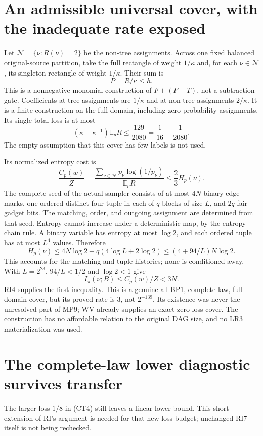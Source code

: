 \documentclass[11pt]{article}
\newcommand{\E}{\mathbb E}
\begin{document}
\section{An admissible universal cover, with the inadequate rate exposed}
Let $\mathcal N=\{\nu:R(\nu)=2\}$ be the non-tree assignments.
Across one fixed balanced original-source partition, take the full
rectangle of weight $1/\kappa$ and, for each $\nu\in\mathcal N$,
its singleton rectangle of weight $1/\kappa$. Their sum is
\[
                         P=R/\kappa\le h.             \tag{CT9}
\]
This is a nonnegative monomial construction of
$F+(F-T)$, not a subtraction gate. Coefficients at tree assignments
are $1/\kappa$ and at non-tree assignments $2/\kappa$.
It is a finite construction on the full domain, including
zero-probability assignments. Its single total loss is at most
\[
 (\kappa-\kappa^{-1})\E_pR
 \le\frac{129}{2080}=\frac1{16}-\frac1{2080}.         \tag{CT10}
\]
The empty assumption that this cover has few labels is not used.

Its normalized entropy cost is
\[
 \frac{C_p(w)}Z
 =\frac{\sum_{\nu\in\mathcal N}p_\nu\log(1/p_\nu)}{\E_pR}
 \le\frac23 H_p(\nu).                                \tag{CT11}
\]
The complete seed of the actual sampler consists of at most $4N$
binary edge marks, one ordered distinct four-tuple in each of $q$
blocks of size $L$, and $2q$ fair gadget bits. The matching, order,
and outgoing assignment are determined from that seed.
Entropy cannot increase under a deterministic map, by the entropy
chain rule. A binary variable has entropy at most $\log2$, and each
ordered tuple has at most $L^4$ values. Therefore
\[
 H_p(\nu)\le4N\log2+q(4\log L+2\log2)
 \le(4+94/L)N\log2.                                 \tag{CT12}
\]
This accounts for the matching and tuple histories; none is
conditioned away. With $L=2^{23}$, $94/L<1/2$ and $\log2<1$ give
\[
                  I_\pi(\nu;B)\le C_p(w)/Z<3N.       \tag{CT13}
\]
RI4 supplies the first inequality. This is a genuine all-BP1,
complete-law, full-domain cover, but its proved rate is $3$, not
$2^{-139}$. Its existence was never the unresolved part of MP9;
WV already supplies an exact zero-loss cover.
The construction has no affordable relation to the original DAG
size, and no LR3 materialization was used.

\section{The complete-law lower diagnostic survives transfer}
The larger loss $1/8$ in (CT4) still leaves a linear lower bound.
This short extension of RI's argument is needed for that new loss
budget; unchanged RI7 itself is not being rechecked.
\end{document}
